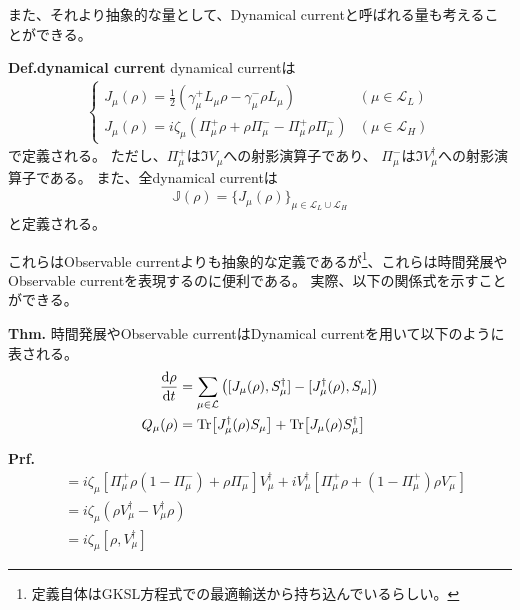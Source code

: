 \documentclass[a4paper,11pt]{jsarticle}
\numberwithin{equation}{section}
\begin{document}
また、それより抽象的な量として、Dynamical currentと呼ばれる量も考えることができる。
\begin{itembox}[l]{\textbf{Def.dynamical current}}
    dynamical currentは
    \begin{align}
        \begin{cases}
            J_{\mu}(\rho) = \frac{1}{2}(\gamma_{\mu}^{+} L_{\mu}\rho - \gamma_{\mu}^{-} \rho L_{\mu}) & (\mu \in \mathcal{L}_{L}) \\
            J_{\mu}(\rho) = i\zeta_{\mu}(\Pi_{\mu}^{+}\rho + \rho \Pi_{\mu}^{-} - \Pi_{\mu}^{+} \rho \Pi_{\mu}^{-}) & (\mu \in \mathcal{L}_{H})
        \end{cases}
    \end{align}
    で定義される。
    ただし、$\Pi_{\mu}^{+}$は$\Im V_{\mu}$への射影演算子であり、
    $\Pi_{\mu}^{-}$は$\Im V_{\mu}^{\dagger}$への射影演算子である。
    また、全dynamical currentは
    \begin{align}
        \mathbb{J}(\rho) = \{J_{\mu}(\rho)\}_{\mu \in \mathcal{L}_{L} \cup \mathcal{L}_{H}}
    \end{align}
    と定義される。
\end{itembox}
これらはObservable currentよりも抽象的な定義であるが\footnote{
    定義自体はGKSL方程式での最適輸送から持ち込んでいるらしい。
}、これらは時間発展やObservable currentを表現するのに便利である。
実際、以下の関係式を示すことができる。
\begin{itembox}[l]{\textbf{Thm.}}
    時間発展やObservable currentはDynamical currentを用いて以下のように表される。
    \begin{align}
        \dv{\rho}{t} &= \sum_{\mu \in \mathcal{L}} \left( [J_{\mu}(\rho), S_{\mu}^{\dagger}] - [J_{\mu}^{\dagger}(\rho), S_{\mu}] \right) \\
        Q_{\mu}(\rho) &= \Tr[ J_{\mu}^{\dagger}(\rho) S_{\mu} ] + \Tr[ J_{\mu}(\rho) S_{\mu}^{\dagger} ]
    \end{align}
\end{itembox}
\textbf{Prf.}
\begin{align}
[J_{\mu}(\rho), V_{\mu}^{\dagger}]
&= i \zeta_{\mu} 
\left[ \Pi_{\mu}^{+} \rho (1 - \Pi_{\mu}^{-}) + \rho \Pi_{\mu}^{-} \right] V_{\mu}^{\dagger}
+ i V_{\mu}^{\dagger} \left[ \Pi_{\mu}^{+} \rho + (1 - \Pi_{\mu}^{+}) \rho V_{\mu}^{-} \right] \\
&= i \zeta_{\mu} (\rho V_{\mu}^{\dagger} - V_{\mu}^{\dagger} \rho)\\
&= i \zeta_{\mu} [\rho, V_{\mu}^{\dagger}] 
\end{align}
\end{document}
